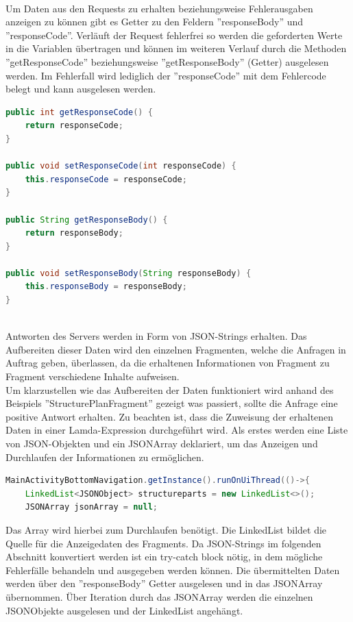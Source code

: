 \cite{OkHttp3}
\\
Um Daten aus den Requests zu erhalten beziehungsweise Fehlerausgaben anzeigen zu können gibt es Getter zu den Feldern ''responseBody'' und ''responseCode''. Verläuft der Request fehlerfrei so werden die geforderten Werte in die Variablen übertragen und können im weiteren Verlauf durch die Methoden ''getResponseCode'' beziehungsweise ''getResponseBody'' (Getter) ausgelesen werden. Im Fehlerfall wird lediglich der ''responseCode'' mit dem Fehlercode belegt und kann ausgelesen werden. 
\begin{lstlisting}[language=Java,caption={Getter und Setter für erhaltene Daten}]
public int getResponseCode() {
    return responseCode;
}

public void setResponseCode(int responseCode) {
    this.responseCode = responseCode;
}

public String getResponseBody() {
    return responseBody;
}

public void setResponseBody(String responseBody) {
    this.responseBody = responseBody;
}
\end{lstlisting}
\\
Antworten des Servers werden in Form von JSON-Strings erhalten. Das Aufbereiten dieser Daten wird den einzelnen Fragmenten, welche die Anfragen in Auftrag geben, überlassen, da die erhaltenen Informationen von Fragment zu Fragment verschiedene Inhalte aufweisen. 
\\
Um klarzustellen wie das Aufbereiten der Daten funktioniert wird anhand des Beispiels ''StructurePlanFragment'' gezeigt was passiert, sollte die Anfrage eine positive Antwort erhalten. Zu beachten ist, dass die Zuweisung der erhaltenen Daten in einer Lamda-Expression durchgeführt wird. Als erstes werden eine Liste von JSON-Objekten und ein JSONArray deklariert, um das Anzeigen und Durchlaufen der Informationen zu ermöglichen.
\begin{lstlisting}[language=Java,caption={Erstellen der benötigten Variablen}]
MainActivityBottomNavigation.getInstance().runOnUiThread(()->{
	LinkedList<JSONObject> structureparts = new LinkedList<>();
    JSONArray jsonArray = null;
\end{lstlisting}
Das Array wird hierbei zum Durchlaufen benötigt. Die LinkedList bildet die Quelle für die Anzeigedaten des Fragments. Da JSON-Strings im folgenden Abschnitt konvertiert werden ist ein try-catch block nötig, in dem mögliche Fehlerfälle behandeln und ausgegeben werden können. Die übermittelten Daten werden über den ''responseBody'' Getter ausgelesen und in das JSONArray übernommen. Über Iteration durch das JSONArray werden die einzelnen JSONObjekte ausgelesen und der LinkedList angehängt.
